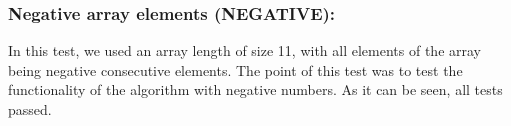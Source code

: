 \documentclass[12pt]{article}
\begin{document}
\subsubsection{Negative array elements (NEGATIVE): }
In this test, we used an array length of size 11, with all elements of the array being negative consecutive elements. The point of this test was to test the functionality of the algorithm with negative numbers. As it can be seen, all tests passed.
\begin{table}[H]
	\centering
	\caption{Negative array elements test results.}
	\label{my-label}
\end{table}
\end{document}

